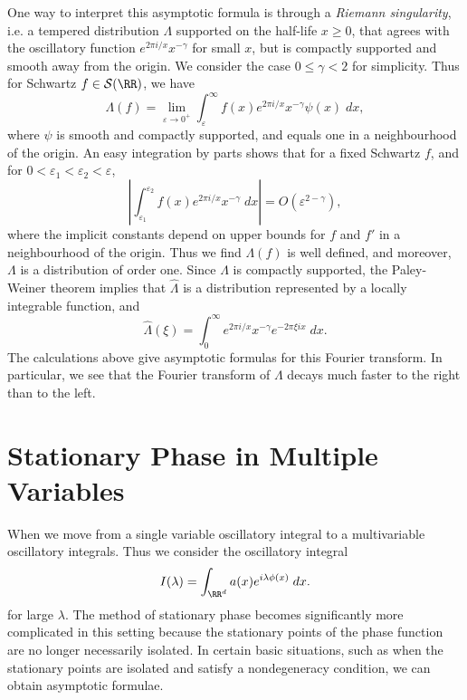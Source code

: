 \begin{example}
  One way to interpret this asymptotic formula is through a \emph{Riemann singularity}, i.e. a tempered distribution $\Lambda$ supported on the half-life $x \geq 0$, that agrees with the oscillatory function $e^{2 \pi i/x} x^{-\gamma}$ for small $x$, but is compactly supported and smooth away from the origin. We consider the case $0 \leq \gamma < 2$ for simplicity. Thus for Schwartz $f \in \mathcal{S}(\RR)$, we have
  \[ \Lambda(f) = \lim_{\varepsilon \to 0^+} \int_\varepsilon^\infty f(x) e^{2 \pi i/x} x^{-\gamma} \psi(x)\; dx, \]
  where $\psi$ is smooth and compactly supported, and equals one in a neighbourhood of the origin. An easy integration by parts shows that for a fixed Schwartz $f$, and for $0 < \varepsilon_1 < \varepsilon_2 < \varepsilon$,
  \[ \left| \int_{\varepsilon_1}^{\varepsilon_2} f(x) e^{2 \pi i/x} x^{-\gamma}\; dx \right| = O\left(\varepsilon^{2-\gamma} \right), \]
  where the implicit constants depend on upper bounds for $f$ and $f'$ in a neighbourhood of the origin. Thus we find $\Lambda(f)$ is well defined, and moreover, $\Lambda$ is a distribution of order one. Since $\Lambda$ is compactly supported, the Paley-Weiner theorem implies that $\widehat{\Lambda}$ is a distribution represented by a locally integrable function, and
  \[ \widehat{\Lambda}(\xi) = \int_0^\infty e^{2 \pi i/x} x^{-\gamma} e^{-2 \pi \xi i x}\; dx. \]
  The calculations above give asymptotic formulas for this Fourier transform. In particular, we see that the Fourier transform of $\Lambda$ decays much faster to the right than to the left.
\end{example}

\section{Stationary Phase in Multiple Variables}

When we move from a single variable oscillatory integral to a multivariable oscillatory integrals. Thus we consider the oscillatory integral
%
\[ I(\lambda) = \int_{\RR^d} a(x) e^{i \lambda \phi(x)}\; dx. \]
%
for large $\lambda$. The method of stationary phase becomes significantly more complicated in this setting because the stationary points of the phase function are no longer necessarily isolated. In certain basic situations, such as when the stationary points are isolated and satisfy a nondegeneracy condition, we can obtain asymptotic formulae.

